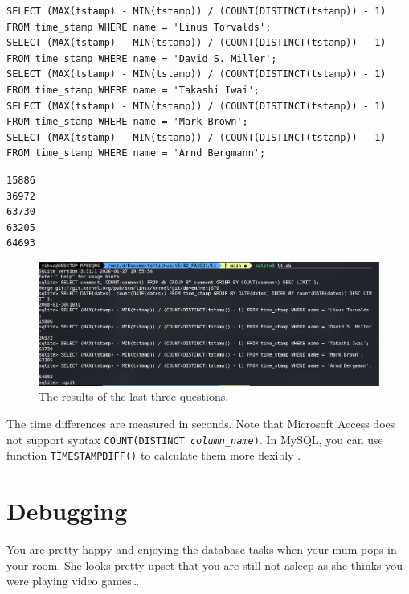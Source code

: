 \documentclass[a4paper]{article}
\begin{document}
\begin{itemize}
\begin{verbatim}
SELECT (MAX(tstamp) - MIN(tstamp)) / (COUNT(DISTINCT(tstamp)) - 1) FROM time_stamp WHERE name = 'Linus Torvalds';
SELECT (MAX(tstamp) - MIN(tstamp)) / (COUNT(DISTINCT(tstamp)) - 1) FROM time_stamp WHERE name = 'David S. Miller';
SELECT (MAX(tstamp) - MIN(tstamp)) / (COUNT(DISTINCT(tstamp)) - 1) FROM time_stamp WHERE name = 'Takashi Iwai';
SELECT (MAX(tstamp) - MIN(tstamp)) / (COUNT(DISTINCT(tstamp)) - 1) FROM time_stamp WHERE name = 'Mark Brown';
SELECT (MAX(tstamp) - MIN(tstamp)) / (COUNT(DISTINCT(tstamp)) - 1) FROM time_stamp WHERE name = 'Arnd Bergmann';
    \end{verbatim}
    \begin{verbatim}
15886
36972
63730
63205
64693
    \end{verbatim}
    \begin{figure}[H]
        \centering
        \includegraphics[width=1\textwidth]{9.png}
        \caption{The results of the last three questions.}
    \end{figure}
    The time differences are measured in seconds. Note that Microsoft Access does not support syntax \texttt{COUNT(DISTINCT \textit{column\_name})}. In MySQL, you can use function \texttt{TIMESTAMPDIFF()} to calculate them more flexibly \cite{tstampdiff}.
\end{itemize}
\section{Debugging}
You are pretty happy and enjoying the database tasks when your mum pops in your room. She looks pretty upset that you are still not asleep as she thinks you were playing video games…
\end{document}

